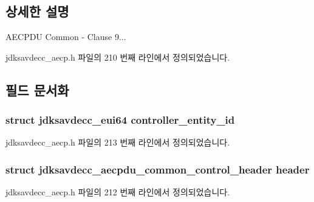 \subsection{상세한 설명}
A\+E\+C\+P\+DU Common -\/ Clause 9... 

jdksavdecc\+\_\+aecp.\+h 파일의 210 번째 라인에서 정의되었습니다.



\subsection{필드 문서화}
\subsubsection[{\texorpdfstring{controller\+\_\+entity\+\_\+id}{controller_entity_id}}]{\setlength{\rightskip}{0pt plus 5cm}struct {\bf jdksavdecc\+\_\+eui64} controller\+\_\+entity\+\_\+id}\hypertarget{structjdksavdecc__aecpdu__common_affc928ddb4fc62d1d04a775d36e5f2c8}{}\label{structjdksavdecc__aecpdu__common_affc928ddb4fc62d1d04a775d36e5f2c8}


jdksavdecc\+\_\+aecp.\+h 파일의 213 번째 라인에서 정의되었습니다.

\subsubsection[{\texorpdfstring{header}{header}}]{\setlength{\rightskip}{0pt plus 5cm}struct {\bf jdksavdecc\+\_\+aecpdu\+\_\+common\+\_\+control\+\_\+header} header}\hypertarget{structjdksavdecc__aecpdu__common_a314cacb6a61bcf18749030c0b6fb7510}{}\label{structjdksavdecc__aecpdu__common_a314cacb6a61bcf18749030c0b6fb7510}


jdksavdecc\+\_\+aecp.\+h 파일의 212 번째 라인에서 정의되었습니다.

